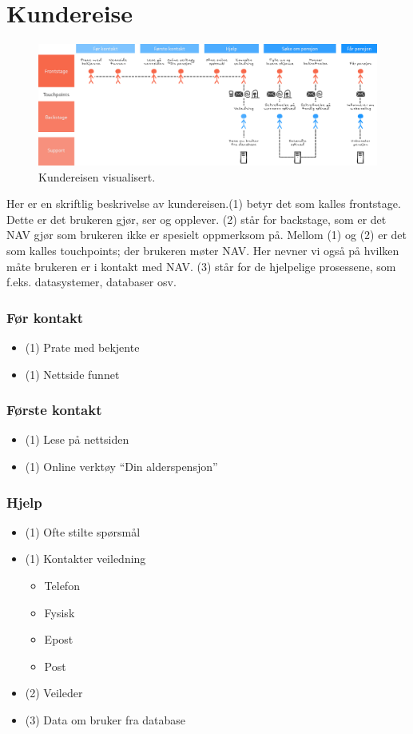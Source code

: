 \documentclass[informationsecurity]{gucmasterproject}
\begin{document}
\section{Kundereise}

\begin{figure}[h!]
	\centering
	\includegraphics[width=59em, angle=270]{kundereise}
	\caption{Kundereisen visualisert.}
	\label{fig:kundereise}
\end{figure}

Her er en skriftlig beskrivelse av kundereisen.(1) betyr det som kalles frontstage. Dette er det brukeren gjør, ser og opplever. (2) står for backstage, som er det NAV gjør som brukeren ikke er spesielt oppmerksom på. Mellom (1) og (2) er det som kalles touchpoints; der brukeren møter NAV. Her nevner vi også på hvilken måte brukeren er i kontakt med NAV. (3) står for de hjelpelige prosessene, som f.eks. datasystemer, databaser osv.

\subsubsection{Før kontakt}
\begin{itemize}
\item (1) Prate med bekjente
\item (1) Nettside funnet
\end{itemize}

\subsubsection{Første kontakt}
\begin{itemize}
\item (1) Lese på nettsiden
\item (1) Online verktøy “Din alderspensjon”
\end{itemize}

\subsubsection{Hjelp}
\begin{itemize}
\item (1) Ofte stilte spørsmål
\item (1) Kontakter veiledning
	\begin{itemize}
	\item Telefon
	\item Fysisk
	\item Epost
	\item Post
	\end{itemize}
\item (2) Veileder
\item (3) Data om bruker fra database
\end{itemize}
\end{document}
